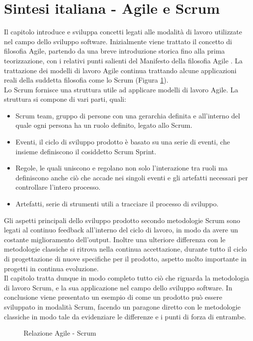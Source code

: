 \documentclass[../main.tex]{subfiles}
\begin{document}
\section{Sintesi italiana - Agile e Scrum}
Il capitolo introduce e sviluppa concetti legati alle modalità di lavoro utilizzate nel campo dello sviluppo software. Inizialmente viene trattato il concetto di filosofia Agile, partendo da una breve introduzione storica fino alla prima teorizzazione, con i relativi punti salienti del Manifesto della filosofia Agile \cite{beck2001agile}. La trattazione dei modelli di lavoro Agile continua trattando alcune applicazioni reali della suddetta filosofia come lo Scrum (Figura \ref{fig:agilesrre}).\\
Lo Scrum fornisce una struttura utile ad applicare modelli di lavoro Agile. La struttura si compone di vari parti, quali:
\begin{itemize}
    \item Scrum team, gruppo di persone con una gerarchia definita e all'interno del quale ogni persona ha un ruolo definito, legato allo Scrum.
    \item Eventi, il ciclo di sviluppo prodotto è basato su una serie di eventi, che insieme definiscono il cosiddetto Scrum Sprint.
    \item Regole, le quali uniscono e regolano non solo l'interazione tra ruoli ma definiscono anche ciò che accade nei singoli eventi e gli artefatti necessari per controllare l'intero processo.
    \item Artefatti, serie di strumenti utili a tracciare il processo di sviluppo.
\end{itemize}
Gli aspetti principali dello sviluppo prodotto secondo metodologie Scrum sono legati al continuo feedback all'interno del ciclo di lavoro, in modo da avere un costante miglioramento dell'output. Inoltre una ulteriore differenza con le metodologie  classiche si ritrova nella continua accettazione, durante tutto il ciclo di progettazione di nuove specifiche per il prodotto, aspetto molto importante in progetti in continua evoluzione.\\
Il capitolo tratta dunque in modo completo tutto ciò che riguarda la metodologia di lavoro Scrum, e la sua applicazione nel campo dello sviluppo software. In conclusione viene presentato un esempio di come un prodotto può essere sviluppato in modalità Scrum, facendo un paragone diretto con le metodologie classiche in modo tale da evidenziare le differenze e i punti di forza di entrambe.
\begin{figure}
    \centering
{} 
    \caption{Relazione Agile - Scrum}
    \label{fig:agilesrre}
\end{figure}
\end{document}
